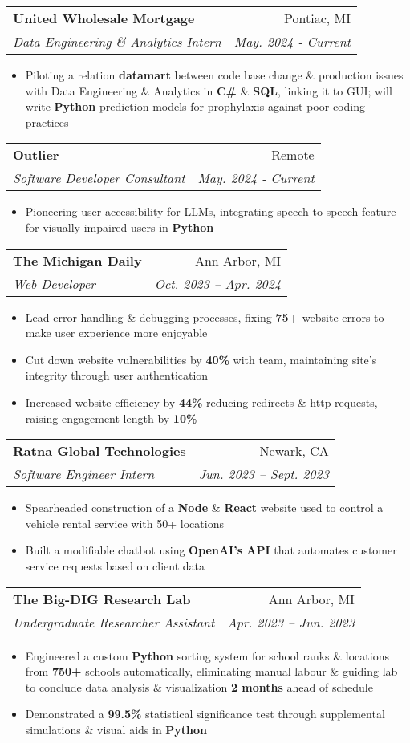 \documentclass[letterpaper,11pt]{article}
\makeatletter
\newcommand{\resumeItem}[1]{
  \item\small{
    {#1 \vspace{-2pt}}
  }
}
\newcommand{\resumeSubheading}[4]{
  \vspace{-2pt}\item
    \begin{tabular*}{0.97\textwidth}[t]{l@{\extracolsep{\fill}}r}
      \textbf{#1} & #2 \\
      \textit{\small#3} & \textit{\small #4} \\
    \end{tabular*}\vspace{-7pt}
}
\newcommand{\resumeItemListStart}{\begin{itemize}}
\newcommand{\resumeItemListEnd}{\end{itemize}\vspace{-5pt}}
\makeatother
\begin{document}
          \resumeSubheading
          {United Wholesale Mortgage}{Pontiac, MI}
          {Data Engineering \& Analytics Intern}{ May. 2024 - Current}
          \resumeItemListStart
            \resumeItem{Piloting a relation \textbf{datamart} between code 
base change 
            \& production issues with Data Engineering \& Analytics in 
\textbf{C\#} \& \textbf{SQL}, linking it to GUI; will write 
\textbf{Python} prediction models for prophylaxis against poor coding 
practices}
          \resumeItemListEnd
          
          \resumeSubheading
          {Outlier}{Remote}
          {Software Developer Consultant} {May. 2024 - Current}
           \resumeItemListStart
            \resumeItem{Pioneering user accessibility for LLMs, 
integrating speech to speech feature for visually impaired users in 
\textbf{Python}}
          \resumeItemListEnd
          \vspace{2pt}

          \resumeSubheading
          {The Michigan Daily}{Ann Arbor, MI}
          {Web Developer}{Oct. 2023 -- Apr. 2024}
          \resumeItemListStart
            \resumeItem{Lead error handling \& debugging processes, fixing 
\textbf{75+} website errors to make user experience more enjoyable}
            \resumeItem{Cut down website vulnerabilities by \textbf{40\%} 
with team, maintaining site's integrity through user authentication}
            \resumeItem{Increased website efficiency by \textbf{44\%} 
reducing redirects \& http requests, raising engagement length by 
\textbf{10\%}}
          \resumeItemListEnd

          \resumeSubheading
          {Ratna Global Technologies}{Newark, CA}
          {Software Engineer Intern}{Jun. 2023 -- Sept. 2023}
          \resumeItemListStart
            \resumeItem{Spearheaded construction of a \textbf{Node} \& 
\textbf{React} website used to control a vehicle rental service with 50+ 
locations}
            \resumeItem{Built a modifiable chatbot using \textbf{OpenAI’s 
API} that automates customer service requests based on client data}
          \resumeItemListEnd
 
          \resumeSubheading
          {The Big-DIG Research Lab}{Ann Arbor, MI}
          {Undergraduate Researcher Assistant}{Apr. 2023 -- Jun. 2023}
          \resumeItemListStart
            \resumeItem{Engineered a custom \textbf{Python} sorting system 
for school ranks \& locations from \textbf{750+} schools automatically, 
eliminating manual labour \& guiding lab to conclude data analysis \& 
visualization \textbf{2 months} ahead of schedule}
            \resumeItem{Demonstrated a \textbf{99.5\%} statistical 
significance test through supplemental simulations \& visual aids in 
\textbf{Python}}
          \resumeItemListEnd
\end{document}
